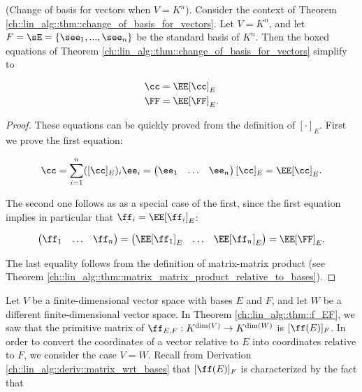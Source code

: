 \begin{remark}
\label{ch::lin_alg::rmk::change_of_basis_vectors_Kn}

    (Change of basis for vectors when $V = K^n$). Consider the context of Theorem \ref{ch::lin_alg::thm::change_of_basis_for_vectors}. Let $V = K^n$, and let $F = \sE = \{ \see_1, ..., \see_n \}$ be the standard basis of $K^n$. Then the boxed equations of Theorem \ref{ch::lin_alg::thm::change_of_basis_for_vectors} simplify to
    
    \begin{align*}
        \cc &= \EE [\cc]_E \\
        \FF &= \EE [\FF]_E.
    \end{align*}
\end{remark}

\begin{proof}
    These equations can be quickly proved from the definition of $[\cdot]_E$. First we prove the first equation:
    
    \begin{align*}
        \cc = \sum_{i = 1}^n ([\cc]_E)_i \ee_i = \begin{pmatrix} \ee_1 & \hdots & \ee_n \end{pmatrix} [\cc]_E = \EE [\cc]_E.
    \end{align*}
    
    The second one follows as as a special case of the first, since the first equation implies in particular that $\ff_i = \EE [\ff_i]_E$:
    
    \begin{align*}
        \begin{pmatrix} \ff_1 & \hdots & \ff_n \end{pmatrix} = \begin{pmatrix} \EE [\ff_1]_E & \hdots & \EE [\ff_n]_E \end{pmatrix} = \EE [\FF]_E.
    \end{align*}
    
    The last equality follows from the definition of matrix-matrix product (see Theorem \ref{ch::lin_alg::thm::matrix_matrix_product_relative_to_bases}).
\end{proof}




    
    Let $V$ be a finite-dimensional vector space with bases $E$ and $F$, and let $W$ be a different finite-dimensional vector space. In Theorem \ref{ch::lin_alg::thm::f_EF}, we saw that the primitive matrix of $\ff_{E,F}:K^{\dim(V)} \rightarrow K^{\dim(W)}$ is $[\ff(E)]_F$. In order to convert the coordinates of a vector relative to $E$ into coordinates relative to $F$, we consider the case $V = W$. Recall from Derivation \ref{ch::lin_alg::deriv::matrix_wrt_bases} that $[\ff(E)]_F$ is characterized by the fact that
    
